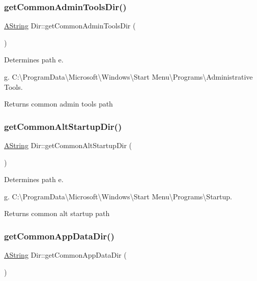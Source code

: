 \subsubsection{\texorpdfstring{getCommonAdminToolsDir()}{getCommonAdminToolsDir()}}
{\footnotesize\ttfamily \mbox{\hyperlink{class_a_string}{A\+String}} Dir\+::get\+Common\+Admin\+Tools\+Dir (\begin{DoxyParamCaption}{ }\end{DoxyParamCaption})\hspace{0.3cm}{\ttfamily [static]}}



Determines path e. 

g. C\+:\textbackslash{}\+Program\+Data\textbackslash{}\+Microsoft\textbackslash{}\+Windows\textbackslash{}\+Start Menu\textbackslash{}\+Programs\textbackslash{}\+Administrative Tools. \begin{DoxyReturn}{Returns}
common admin tools path 
\end{DoxyReturn}
\mbox{\label{class_dir_a92838da10b3786879bc65d03dd38c180}} 
\subsubsection{\texorpdfstring{getCommonAltStartupDir()}{getCommonAltStartupDir()}}
{\footnotesize\ttfamily \mbox{\hyperlink{class_a_string}{A\+String}} Dir\+::get\+Common\+Alt\+Startup\+Dir (\begin{DoxyParamCaption}{ }\end{DoxyParamCaption})\hspace{0.3cm}{\ttfamily [static]}}



Determines path e. 

g. C\+:\textbackslash{}\+Program\+Data\textbackslash{}\+Microsoft\textbackslash{}\+Windows\textbackslash{}\+Start Menu\textbackslash{}\+Programs\textbackslash{}\+Startup. \begin{DoxyReturn}{Returns}
common alt startup path 
\end{DoxyReturn}
\mbox{\label{class_dir_aaa0a0cf7399f3b70358ced7dfcb0e8f9}} 
\subsubsection{\texorpdfstring{getCommonAppDataDir()}{getCommonAppDataDir()}}
{\footnotesize\ttfamily \mbox{\hyperlink{class_a_string}{A\+String}} Dir\+::get\+Common\+App\+Data\+Dir (\begin{DoxyParamCaption}{ }\end{DoxyParamCaption})\hspace{0.3cm}{\ttfamily [static]}}




